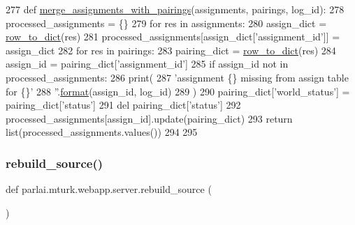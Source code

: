 \begin{DoxyCode}
277 \textcolor{keyword}{def }\hyperlink{namespaceparlai_1_1mturk_1_1webapp_1_1server_abe6ddbf97d0e5c26315fa927ed076489}{merge\_assignments\_with\_pairings}(assignments, pairings, log\_id):
278     processed\_assignments = \{\}
279     \textcolor{keywordflow}{for} res \textcolor{keywordflow}{in} assignments:
280         assign\_dict = \hyperlink{namespaceparlai_1_1mturk_1_1webapp_1_1server_a92be47964fa33a4b6a14d4069d091c7d}{row\_to\_dict}(res)
281         processed\_assignments[assign\_dict[\textcolor{stringliteral}{'assignment\_id'}]] = assign\_dict
282     \textcolor{keywordflow}{for} res \textcolor{keywordflow}{in} pairings:
283         pairing\_dict = \hyperlink{namespaceparlai_1_1mturk_1_1webapp_1_1server_a92be47964fa33a4b6a14d4069d091c7d}{row\_to\_dict}(res)
284         assign\_id = pairing\_dict[\textcolor{stringliteral}{'assignment\_id'}]
285         \textcolor{keywordflow}{if} assign\_id \textcolor{keywordflow}{not} \textcolor{keywordflow}{in} processed\_assignments:
286             print(
287                 \textcolor{stringliteral}{'assignment \{\} missing from assign table for \{\}'}
288                 \textcolor{stringliteral}{''}.\hyperlink{namespaceparlai_1_1chat__service_1_1services_1_1messenger_1_1shared__utils_a32e2e2022b824fbaf80c747160b52a76}{format}(assign\_id, log\_id)
289             )
290         pairing\_dict[\textcolor{stringliteral}{'world\_status'}] = pairing\_dict[\textcolor{stringliteral}{'status'}]
291         del pairing\_dict[\textcolor{stringliteral}{'status'}]
292         processed\_assignments[assign\_id].update(pairing\_dict)
293     \textcolor{keywordflow}{return} list(processed\_assignments.values())
294 
295 
\end{DoxyCode}
\mbox{\label{namespaceparlai_1_1mturk_1_1webapp_1_1server_a0ce17c85e37b7734ab2fbaca711cb45f}} 
\subsubsection{\texorpdfstring{rebuild\+\_\+source()}{rebuild\_source()}}
{\footnotesize\ttfamily def parlai.\+mturk.\+webapp.\+server.\+rebuild\+\_\+source (\begin{DoxyParamCaption}{ }\end{DoxyParamCaption})}



